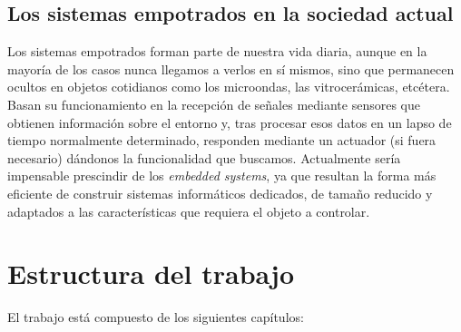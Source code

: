 \subsection{Los sistemas empotrados en la sociedad actual}

Los sistemas empotrados forman parte de nuestra vida diaria, aunque en la mayoría de los casos nunca llegamos a verlos en sí mismos, sino que permanecen ocultos en objetos cotidianos como los microondas, las vitrocerámicas, etcétera. Basan su funcionamiento en la recepción de señales mediante sensores que obtienen información sobre el entorno y, tras procesar esos datos en un lapso de tiempo normalmente determinado, responden mediante un actuador (si fuera necesario) dándonos la funcionalidad que buscamos. Actualmente sería impensable prescindir de los \textit{embedded systems}, ya que resultan la forma más eficiente de construir sistemas informáticos dedicados, de tamaño reducido y adaptados a las características que requiera el objeto a controlar.


\newpage
\section{Estructura del trabajo}

El trabajo está compuesto de los siguientes capítulos: 


